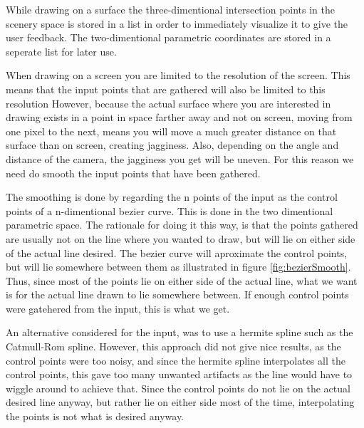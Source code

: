\documentclass[a4paper,12pt]{article}
\begin{document}
While drawing on a surface the three-dimentional intersection points in the scenery space is stored in a list in order to immediately visualize it to give the user feedback. The two-dimentional parametric coordinates are stored in a seperate list for later use.

When drawing on a screen you are limited to the resolution of the screen. This means that the input points that are gathered will also be limited to this resolution However, because the actual surface where you are interested in drawing exists in a point in space farther away and not on screen, moving from one pixel to the next, means you will move a much greater distance on that surface than on screen, creating jagginess. Also, depending on the angle and distance of the camera, the jagginess you get will be uneven. For this reason we need do smooth the input points that have been gathered. 

The smoothing is done by regarding the n points of the  input as the control points of a n-dimentional bezier curve. This is done in the two dimentional parametric space. The rationale for doing it this way, is that the points gathered are usually not on the line where you wanted to draw, but will lie on either side of the actual line desired. The bezier curve will aproximate the control points, but will lie somewhere between them as illustrated in figure \ref{fig:bezierSmooth}. Thus, since most of the points lie on either side of the actual line, what we want is for the actual line drawn to lie somewhere between. If enough control points were gatehered from the input, this is what we get.

An alternative considered for the input, was to use a hermite spline such as the Catmull-Rom spline. However, this approach did not give nice results, as the control points were too noisy, and since the hermite spline interpolates all the control points, this gave too many unwanted artifacts as the line would have to wiggle around to achieve that. Since the control points do not lie on the actual desired line anyway, but rather lie on either side most of the time, interpolating the points is not what is desired anyway.
\end{document}
